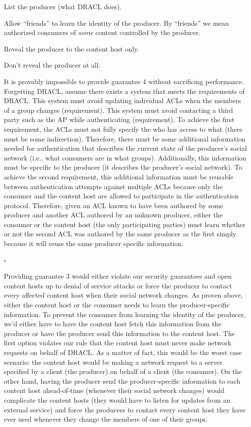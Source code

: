 \documentclass[pdftex,12pt,a4papaer,twoside,notitlepage]{report}
\begin{document}
\begin{compactenum}
\item List the producer (what DRACL does).
\item Allow ``friends'' to learn the identity of the producer. By ``friends'' we
  mean authorized consumers of \emph{some} content controlled by the producer.
\item Reveal the producer to the content host only.
\item Don't reveal the producer at all.
\end{compactenum}

It is provably impossible to provide guarantee 4 without sacrificing
performance. Forgetting DRACL, assume there exists a system that meets the
requirements of DRACL. This system must avoid updating individual ACLs when the
members of a group changes (requirement). This system must avoid contacting a
third party such as the AP while authenticating (requirement). To achieve the
first requirement, the ACLs must not fully specify the who has access to what
(there must be some indirection). Therefore, there must be some additional
information needed for authentication that describes the current state of the
producer's social network (i.e., what consumers are in what groups).
Additionally, this information must be specific to the producer (it describes
the producer's social network). To achieve the second requirement, this
additional information must be reusable between authentication attempts against
multiple ACLs because only the consumer and the content host are allowed to
participate in the authentication protocol. Therefore, given an ACL known to
have been authored by some producer and another ACL authored by an unknown
producer, either the consumer or the content host (the only participating
parties) must learn whether or not the second ACL was authored by the same
producer as the first simply because it will reuse the same producer specific
information.

{\hfill $\square$}

Providing guarantee 3 would either violate our security guarantees and open
content hosts up to denial of service attacks or force the producer to contact
every affected content host when their social network changes. As proven above,
either the content host or the consumer needs to learn the producer-specific
information. To prevent the consumer from learning the identity of the producer,
we'd either have to have the content host fetch this information from the
producer or have the producer send this information to the content host. The
first option violates our rule that the content host must never make network
requests on behalf of DRACL\@. As a matter of fact, this would be the worst case
scenario: the content host would be making a network request to a server
specified by a client (the producer) on behalf of a client (the consumer). On
the other hand, having the producer send the producer-specific information to
each content host ahead-of-time (whenever their social network changes) would
complicate the content hosts (they would have to listen for updates from an
external service) and force the producers to contact every content host they
have ever used whenever they change the members of one of their groups.
\end{document}
